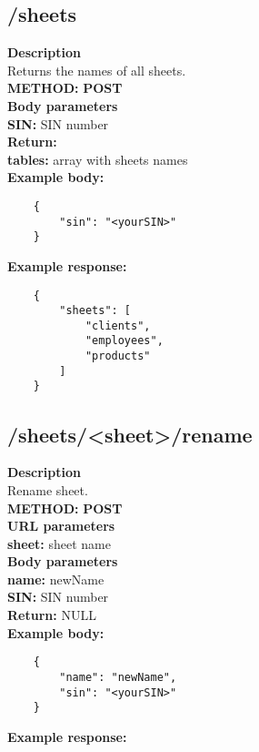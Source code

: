 \documentclass[a4paper, 12pt]{report}
\begin{document}
\subsection{/sheets}
\textbf{\color{redText} Description} \\
Returns the names of all sheets. \\
\textbf{\color{redText} METHOD: } \textbf{POST} \\
\textbf{\color{redText} Body parameters} \\
\textbf{SIN: } SIN number\\
\textbf{\color{redText} Return: } \\
\textbf{tables: } array with sheets names \\
\textbf{\color{redText} Example body: }
\begin{lstlisting}
    {
        "sin": "<yourSIN>"
    }
\end{lstlisting}
\textbf{\color{redText} Example response: }
\begin{lstlisting}
    {
        "sheets": [
            "clients",
            "employees",
            "products"
        ]
    }
\end{lstlisting}

\subsection{/sheets/<sheet>/rename}
\textbf{\color{redText} Description} \\
Rename sheet. \\
\textbf{\color{redText} METHOD: } \textbf{POST} \\
\textbf{\color{redText} URL parameters} \\
\textbf{sheet: } sheet name\\
\textbf{\color{redText} Body parameters} \\
\textbf{name: } newName\\
\textbf{SIN: } SIN number\\
\textbf{\color{redText} Return: } NULL \\
\textbf{\color{redText} Example body: }
\begin{lstlisting}
    {
        "name": "newName",
        "sin": "<yourSIN>"
    }
\end{lstlisting}
\textbf{\color{redText} Example response: }
\end{document}
